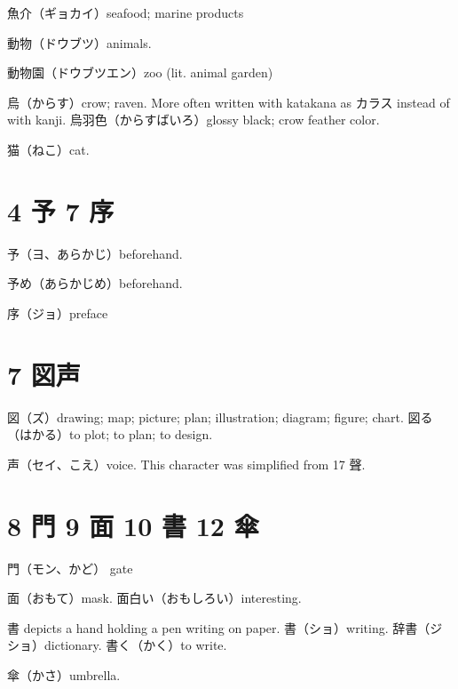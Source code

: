 魚介（ギョカイ）seafood; marine products

動物（ドウブツ）animals.

動物園（ドウブツエン）zoo (lit. animal garden)

烏（からす）crow; raven.
More often written with katakana as カラス instead of with kanji.
烏羽色（からすばいろ）glossy black; crow feather color.

猫（ねこ）cat.

\section{4 予 7 序}

予（ヨ、あらかじ）beforehand.

予め（あらかじめ）beforehand.

序（ジョ）preface

\section{7 図声}

図（ズ）drawing; map; picture; plan; illustration; diagram; figure; chart.
図る（はかる）to plot; to plan; to design.

声（セイ、こえ）voice.
This character was simplified from 17 聲.

\section{8 門 9 面 10 書 12 傘}

門（モン、かど） gate

面（おもて）mask.
面白い（おもしろい）interesting.

書 depicts a hand holding a pen writing on paper.
書（ショ）writing.
辞書（ジショ）dictionary.
書く（かく）to write.

傘（かさ）umbrella.
